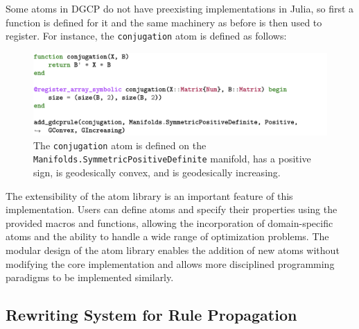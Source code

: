\documentclass[twoside,11pt]{article}
\begin{document}
Some atoms in DGCP do not have preexisting implementations in Julia, so first a function is defined for it and the same machinery as before is then used to register. For instance, the \texttt{conjugation} atom is defined as follows:




\begin{figure}
    \centering
    \includegraphics[width=\linewidth]{listing/2.png}
    \caption{The \texttt{conjugation} atom is defined on the \texttt{Manifolds.SymmetricPositiveDefinite} manifold, has a positive sign, is geodesically convex, and is geodesically increasing.}
    \label{conjugation}
\end{figure}

The extensibility of the atom library is an important feature of this implementation. Users can define atoms and specify their properties using the provided macros and functions, allowing the incorporation of domain-specific atoms and the ability to handle a wide range of optimization problems. The modular design of the atom library enables the addition of new atoms without modifying the core implementation and allows more disciplined programming paradigms to be implemented similarly.

\subsection{Rewriting System for Rule Propagation}
\end{document}
